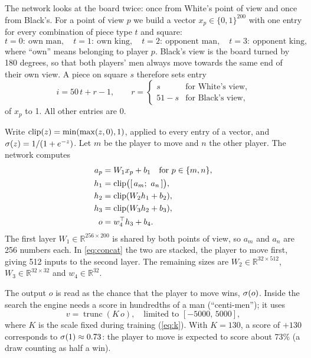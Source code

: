 The network looks at the board twice: once from White's point of view and once
from Black's. For a point of view $p$ we build a vector $x_p \in \{0,1\}^{200}$
with one entry for every combination of piece type $t$ and square:
\[
  t = 0:\ \text{own man},\quad t = 1:\ \text{own king},\quad
  t = 2:\ \text{opponent man},\quad t = 3:\ \text{opponent king},
\]
where ``own'' means belonging to player $p$. Black's view is the board turned
by 180 degrees, so that both players' men always move towards the same end of
their own view. A piece on square $s$ therefore sets entry
\begin{equation}\label{eq:feature}
  i = 50\,t + r - 1, \qquad r = \begin{cases} s & \text{for White's view},\\ 51 - s & \text{for Black's view},\end{cases}
\end{equation}
of $x_p$ to 1. All other entries are 0.

Write $\operatorname{clip}(z) = \min(\max(z,0),1)$, applied to every entry of a vector, and
$\sigma(z) = 1/(1+e^{-z})$. Let $m$ be the player to move and $n$ the other
player. The network computes
\begin{align}
  a_p &= W_1 x_p + b_1 \quad \text{for } p \in \{m, n\}, \label{eq:l1}\\
  h_1 &= \operatorname{clip}\bigl([\,a_m;\ a_n\,]\bigr), \label{eq:concat}\\
  h_2 &= \operatorname{clip}(W_2 h_1 + b_2), \label{eq:l2}\\
  h_3 &= \operatorname{clip}(W_3 h_2 + b_3), \label{eq:l3}\\
  o   &= w_4^{\top} h_3 + b_4 . \label{eq:out}
\end{align}
The first layer $W_1 \in \mathbb{R}^{256\times200}$ is shared by both points of
view, so $a_m$ and $a_n$ are 256 numbers each. In \cref{eq:concat} the two are
stacked, the player to move first, giving 512 inputs to the second layer. The
remaining sizes are $W_2 \in \mathbb{R}^{32\times512}$,
$W_3 \in \mathbb{R}^{32\times32}$ and $w_4 \in \mathbb{R}^{32}$.

The output $o$ is read as the chance that the player to move wins, $\sigma(o)$.
Inside the search the engine needs a score in hundredths of a man
(``centi-men''); it uses
\begin{equation}\label{eq:score}
  v = \operatorname{trunc}(K\,o), \quad \text{limited to } [-5000,\,5000],
\end{equation}
where $K$ is the scale fixed during training (\cref{eq:k}). With $K=130$, a score
of $+130$ corresponds to $\sigma(1)\approx 0.73$: the player to move is expected to
score about 73\% (a draw counting as half a win).

